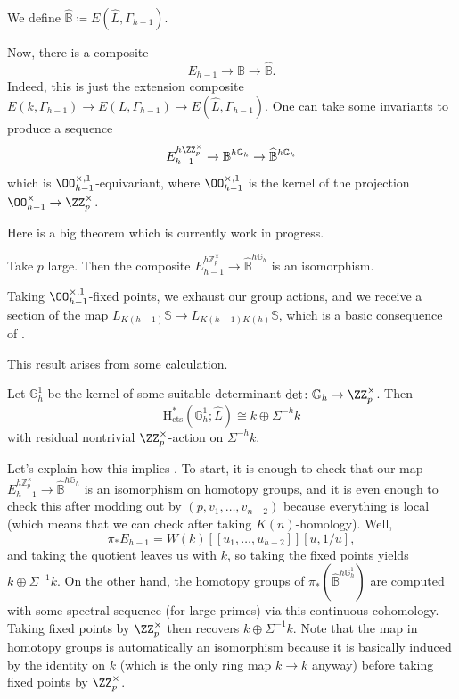 \documentclass[../notes.tex]{subfiles}
\begin{document}
\begin{notation}
	We define $\widehat{\mathbb B}\coloneqq E(\widehat L,\Gamma_{h-1})$.
\end{notation}
Now, there is a composite
\[E_{h-1}\to\mathbb B\to\widehat{\mathbb B}.\]
Indeed, this is just the extension composite $E(k,\Gamma_{h-1})\to E(L,\Gamma_{h-1})\to E(\widehat L,\Gamma_{h-1})$. One can take some invariants to produce a sequence
\[E_{h-1}^{h\ZZ_p^\times}\to\mathbb B^{h\mathbb G_h}\to\widehat{\mathbb B}^{h\mathbb G_h}\]
which is $\OO_{h-1}^{\times,1}$-equivariant, where $\OO_{h-1}^{\times,1}$ is the kernel of the projection $\OO_{h-1}^\times\to\ZZ_p^\times$.

Here is a big theorem which is currently work in progress.
\begin{theorem} \label{thm:easy-chromatic-splitting}
	Take $p$ large. Then the composite $E_{h-1}^{h\mathbb Z_p^\times}\to\widehat{\mathbb B}^{h\mathbb G_h}$ is an isomorphism.
\end{theorem}
\begin{remark}
	Taking $\OO_{h-1}^{\times,1}$-fixed points, we exhaust our group actions, and we receive a section of the map $L_{K(h-1)}\mathbb S\to L_{K(h-1)K(h)}\mathbb S$, which is a basic consequence of .
\end{remark}
This result arises from some calculation.
\begin{theorem}
	Let $\mathbb G_h^1$ be the kernel of some suitable determinant $\det\colon\mathbb G_h\to\ZZ_p^\times$. Then
	\[\mathrm H^*_{\mathrm{cts}}\left(\mathbb G_h^1;\widehat L\right)\cong k\oplus\Sigma^{-h}k\]
	with residual nontrivial $\ZZ_p^\times$-action on $\Sigma^{-h}k$.
\end{theorem}
\begin{remark} \label{rem:get-chromatic-splitting}
	Let's explain how this implies . To start, it is enough to check that our map $E_{h-1}^{h\mathbb Z_p^\times}\to\widehat{\mathbb B}^{h\mathbb G_h}$ is an isomorphism on homotopy groups, and it is even enough to check this after modding out by $(p,v_1,\ldots,v_{n-2})$ because everything is local (which means that we can check after taking $K(n)$-homology). Well,
	\[\pi_*E_{h-1}=W(k)[[u_1,\ldots,u_{h-2}]][u,1/u],\]
	and taking the quotient leaves us with $k$, so taking the fixed points yields $k\oplus\Sigma^{-1}k$. On the other hand, the homotopy groups of $\pi_*(\widehat{\mathbb B}^{h\mathbb G_h^1})$ are computed with some spectral sequence (for large primes) via this continuous cohomology. Taking fixed points by $\ZZ_p^\times$ then recovers $k\oplus\Sigma^{-1}k$. Note that the map in homotopy groups is automatically an isomorphism because it is basically induced by the identity on $k$ (which is the only ring map $k\to k$ anyway) before taking fixed points by $\ZZ_p^\times$.
\end{remark}
\end{document}
